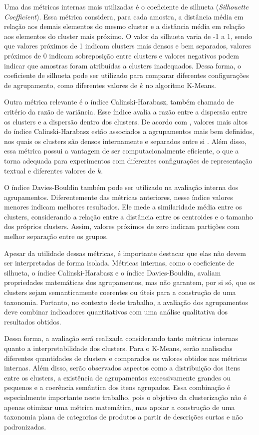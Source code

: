 \documentclass[english,brazilian]{UNISINOSmonografia}
\begin{document}
Uma das métricas internas mais utilizadas é o coeficiente de silhueta (\textit{Silhouette Coefficient}). Essa métrica considera, para cada amostra, a distância média em relação aos demais elementos do mesmo cluster e a distância média em relação aos elementos do cluster mais próximo. O valor da silhueta varia de -1 a 1, sendo que valores próximos de 1 indicam clusters mais densos e bem separados, valores próximos de 0 indicam sobreposição entre clusters e valores negativos podem indicar que amostras foram atribuídas a clusters inadequados. Dessa forma, o coeficiente de silhueta pode ser utilizado para comparar diferentes configurações de agrupamento, como diferentes valores de $k$ no algoritmo K-Means.

Outra métrica relevante é o índice Calinski-Harabasz, também chamado de critério da razão de variância. Esse índice avalia a razão entre a dispersão entre os clusters e a dispersão dentro dos clusters. De acordo com \cite{scikit-learn-clustering}, valores mais altos do índice Calinski-Harabasz estão associados a agrupamentos mais bem definidos, nos quais os clusters são densos internamente e separados entre si . Além disso, essa métrica possui a vantagem de ser computacionalmente eficiente, o que a torna adequada para experimentos com diferentes configurações de representação textual e diferentes valores de $k$.

O índice Davies-Bouldin também pode ser utilizado na avaliação interna dos agrupamentos. Diferentemente das métricas anteriores, nesse índice valores menores indicam melhores resultados. Ele mede a similaridade média entre os clusters, considerando a relação entre a distância entre os centroides e o tamanho dos próprios clusters. Assim, valores próximos de zero indicam partições com melhor separação entre os grupos.

Apesar da utilidade dessas métricas, é importante destacar que elas não devem ser interpretadas de forma isolada. Métricas internas, como o coeficiente de silhueta, o índice Calinski-Harabasz e o índice Davies-Bouldin, avaliam propriedades matemáticas dos agrupamentos, mas não garantem, por si só, que os clusters sejam semanticamente coerentes ou úteis para a construção de uma taxonomia. Portanto, no contexto deste trabalho, a avaliação dos agrupamentos deve combinar indicadores quantitativos com uma análise qualitativa dos resultados obtidos.

Dessa forma, a avaliação será realizada considerando tanto métricas internas quanto a interpretabilidade dos clusters. Para o K-Means, serão analisadas diferentes quantidades de clusters e comparados os valores obtidos nas métricas internas. Além disso, serão observados aspectos como a distribuição dos itens entre os clusters, a existência de agrupamentos excessivamente grandes ou pequenos e a coerência semântica dos itens agrupados. Essa combinação é especialmente importante neste trabalho, pois o objetivo da clusterização não é apenas otimizar uma métrica matemática, mas apoiar a construção de uma taxonomia plana de categorias de produtos a partir de descrições curtas e não padronizadas.
\end{document}
